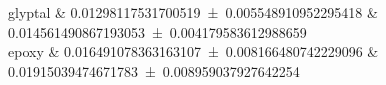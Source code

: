 glyptal 		&		\num{0.01298117531700519 \pm 0.005548910952295418} 		&		\num{0.014561490867193053 \pm 0.004179583612988659}	 \\ 
epoxy 		&		\num{0.016491078363163107 \pm 0.008166480742229096} 		&		\num{0.01915039474671783 \pm 0.008959037927642254}	 \\ 
